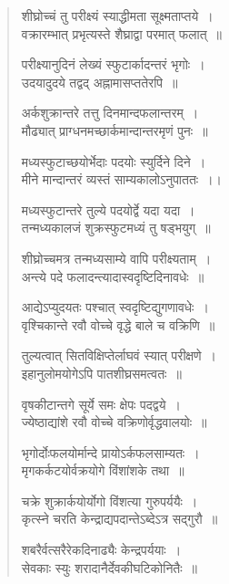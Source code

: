 \documentclass[11pt, openany]{book}
\begin{document}
\newpage
\begin{quote}
{\qt शीघ्रोच्चं तु परीक्ष्यं स्याद्धीमता सूक्ष्मताप्तये~।\\
वक्रारम्भात् प्रभृत्यस्ते शैघ्राद्वा परमात् फलात्~॥

परीक्ष्यानुदिनं लेख्यं स्फुटार्कादन्तरं भृगोः~।\\
उदयादुदये तद्वद् अह्नामासप्ततेरपि~॥

अर्कशुक्रान्तरे तत्तु दिनमान्दफलान्तरम्~।\\
मौढ्यात् प्राग्धनमच्छार्कमान्दान्तरमृणं पुनः~॥

मध्यस्फुटाच्छयोर्भेदाः पदयोः स्युर्दिने दिने~।\\
मीने मान्दान्तरं व्यस्तं साम्यकालोऽनुपाततः~।।

मध्यस्फुटान्तरे तुल्ये पदयोर्द्वे यदा यदा~।\\
तन्मध्यकालजं शुक्रस्फुटमध्यं तु षड्भयुग्~॥

शीघ्रोच्चमत्र तन्मध्यसाम्ये वापि परीक्ष्यताम्~।\\
अन्त्ये पदे फलादन्त्यादास्वदृष्टिदिनावधेः~॥

आद्येऽप्युदयतः पश्चात् स्वदृष्टिद्युगणावधेः~।\\
वृश्चिकान्ते रवौ वोच्चे वृद्धे बाले च वक्रिणि~॥

तुल्यत्वात् सितविक्षिप्तेर्लाघवं स्यात् परीक्षणे~।\\
इहानुलोमयोगेऽपि पातशीघ्रसमत्वतः~॥

वृषकीटान्तगे सूर्ये समः क्षेपः पदद्वये~।\\
ज्येष्ठाद्यांशे रवौ वोच्चे वक्रिणोर्वृद्धवालयोः~॥

भृगोर्दोःफलयोर्मान्दे प्रायोऽर्कफलसाम्यतः~।\\
मृगकर्कटयोर्वक्रयोगे विंशांशके तथा~॥

चक्रे शुक्रार्कयोर्योगो विंशत्या गुरुपर्ययैः~।\\
कृत्स्ने चरति केन्द्राद्यपदान्तेऽब्देऽत्र सद्गुरौ~॥

शबरैर्वत्सरैरेकदिनाढ्यैः केन्द्रपर्ययाः~।\\
सेवकाः स्युः शरादानैर्देवकीघटिकोनितैः~॥}
\end{quote}

\newpage
\end{document}

